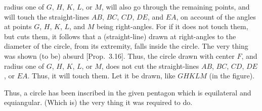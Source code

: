 \begin{Parallel}{}{}
{radius one of $G$, $H$, $K$, $L$, or $M$, will also go through the remaining
points, and will touch the straight-lines $AB$, $BC$, $CD$, $DE$, and $EA$,
on account of the angles at points $G$, $H$, $K$, $L$, and $M$ being
right-angles. For if it does not touch them, but cuts them, 
 it follows that a (straight-line) drawn at right-angles to the diameter
 of the circle, from its extremity, falls inside the circle.
 The very thing was shown (to be) absurd [Prop.~3.16]. Thus, the circle drawn
 with center $F$, and radius one of $G$, $H$, $K$, $L$,  or $M$, does not
 cut the straight-lines $AB$, $BC$, $CD$, $DE$, or $EA$. Thus, it will
 touch them. Let it be drawn, like $GHKLM$ (in the figure).

\epsfysize=2.2in
\centerline{}
 
 Thus, a circle has been inscribed in the given pentagon which is
 equilateral and equiangular. (Which is) the very thing it was required to
 do.}
\end{Parallel}

